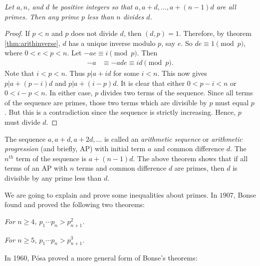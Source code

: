 \documentclass{subfiles}
\begin{document}
	\begin{theorem}\slshape
		Let $a,n$, and $d$ be positive integers so that $a,a+d,\ldots,a+(n-1)d$ are all primes. Then any prime $p$ less than $n$ divides $d$.
	\end{theorem}

	\begin{proof}
		If $p<n$ and $p$ does not divide $d$, then $(d,p)=1$. Therefore, by theorem \autoref{thm:arithinverse}, $d$ has a unique inverse modulo $p$, say $e$. So $de\equiv1\pmod p$, where $0<e<p<n$. Let $-ae \equiv i \pmod p$. Then
			\begin{align*}
				-a & \equiv -ade \equiv id \pmod p.
			\end{align*}
		Note that $i<p<n$. Thus $p|a+id$ for some $i<n$. This now gives $p|a+(p-i)d$ and $p|a+(i-p)d$. It is clear that either $0<p-i<n$ or $0<i-p<n$. In either case, $p$ divides two terms of the sequence. Since all terms of the sequence are primes, those two terms which are divisible by $p$ must equal $p$. But this is a contradiction since the sequence is strictly increasing. Hence, $p$ must divide $d$.
	\end{proof}

	\begin{remark}
		The sequence $a, a+d, a+2d, \ldots$ is called an \textit{arithmetic sequence} or \textit{arithmetic progression} (and briefly, AP) with initial term $a$ and common difference $d$. The $n^{th}$ term of the sequence is $a+(n-1)d$. The above theorem shows that if all terms of an AP with $n$ terms and common difference $d$ are primes, then $d$ is divisible by any prime less than $d$.
	\end{remark}

	We are going to explain and prove some inequalities about primes. In $1907$, Bonse found and proved the following two theorems:
	\begin{theorem}\sl
		For $n\geq 4$, $p_1\cdots p_n>p_{n+1}^2$.\label{thm:bonse1}
	\end{theorem}

	\begin{theorem}\sl
		For $n \geq 5$, $p_1\cdots p_n>p_{n+1}^3$.\label{thm:bonse2}
	\end{theorem}

	In 1960, P\'{o}sa proved a more general form of Bonse's theorems:
\end{document}
